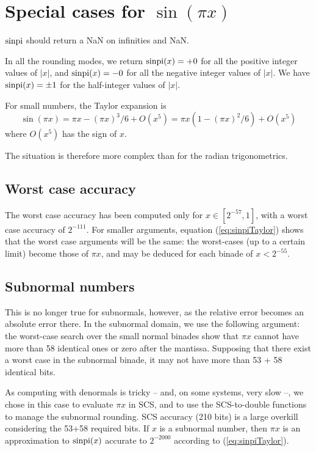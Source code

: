 \section{Special cases for $\sin(\pi x)$}
$\operatorname{sinpi}$ should return a NaN on infinities and NaN.

In all the rounding modes, we return $\operatorname{sinpi}(x)=+0$ for all the positive
integer values of $|x|$, and $\operatorname{sinpi}(x)=-0$ for all the negative integer
values of $|x|$. We have $\operatorname{sinpi}(x)=\pm 1$ for  the half-integer
values of $|x|$. 

For small numbers, the Taylor expansion is
\begin{equation}
  \sin(\pi x) = \pi x - (\pi x)^3/6 + O(x^5) = \pi x(1-(\pi
  x)^2/6) + O(x^5)\label{eq:sinpiTaylor}
\end{equation}
  where $O(x^5)$ has the sign of $x$. 

The situation is therefore more complex than for the radian
trigonometrics.

\subsection{Worst case accuracy}

The worst case accuracy has been computed only for $x \in [2^{-57},
1]$, with a worst case accuracy of $2^{-111}$. For smaller arguments,
equation (\ref{eq:sinpiTaylor}) shows that the worst case arguments
will be the same: the worst-cases (up to a certain limit) become those
of $\pi x$, and may be deduced for each binade of $x<2^{-55}$.

\subsection{Subnormal numbers}
This is no longer true for subnormals, however, as the relative error
becomes an absolute error there. In the subnormal domain, we use the
following argument: the worst-case search over the small normal
binades show that $\pi x$ cannot have more than 58 identical ones or
zero after the mantissa.  Supposing that there exist a worst case in
the subnormal binade, it may not have more than 53 + 58 identical
bits.

As computing with denormals is tricky -- and, on some systems, very
slow --, we chose in this case to evaluate $\pi x$ in SCS, and to use
the SCS-to-double functions to manage the subnormal rounding. SCS
accuracy (210 bits) is a large overkill considering the 53+58 required
bits. If $x$ is a subnormal number, then $\pi x$ is an approximation to
$\operatorname{sinpi}(x)$ accurate to $2^{-2000}$ according to
(\ref{eq:sinpiTaylor}). 



